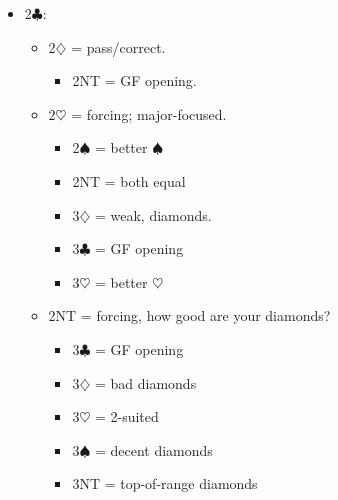 \documentclass[a4paper,12pt]{article}
\begin{document}
\begin{itemize}
\item 2$\clubsuit$:
	\begin{itemize}
   \item 2$\diamondsuit$ = pass/correct.
		\begin{itemize}
      \item 2NT = GF opening.
		\end{itemize}
   \item 2$\heartsuit$ = forcing; major-focused.
		\begin{itemize}
      \item 2$\spadesuit$ = better $\spadesuit$
      \item 2NT = both equal
      \item 3$\diamondsuit$ = weak, diamonds.
      \item 3$\clubsuit$ = GF opening
      \item 3$\heartsuit$ = better $\heartsuit$
		\end{itemize}
   \item 2NT = forcing, how good are your diamonds?
		\begin{itemize}
      \item 3$\clubsuit$ = GF opening
      \item 3$\diamondsuit$ = bad diamonds
      \item 3$\heartsuit$ = 2-suited
      \item 3$\spadesuit$ = decent diamonds
      \item 3NT = top-of-range diamonds
		\end{itemize}
	\end{itemize}


\end{itemize}
\end{document}

